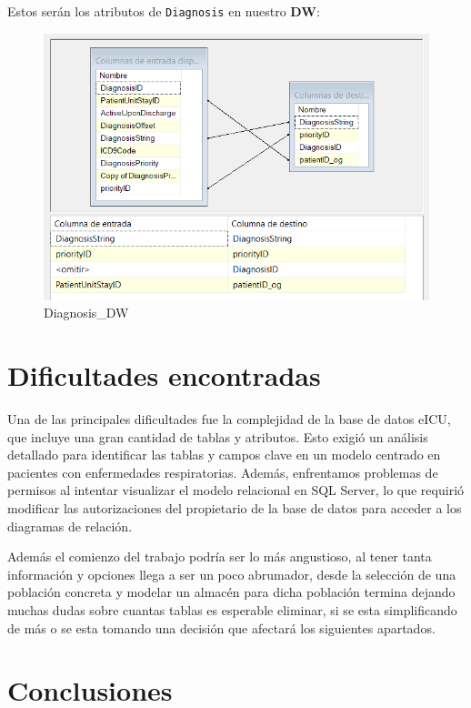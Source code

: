 \documentclass[12pt, a4paper, twoside]{article}
\begin{document}
	Estos serán los atributos de \texttt{Diagnosis} en nuestro \textbf{DW}:
	
	\begin{figure}[h!]
		\centering
		\includegraphics[width=1\textwidth]{image/112_carga_diagnosis_destino.png}
		\caption{Diagnosis\_DW}
		\label{fig:30}
	\end{figure}

	\section{Dificultades encontradas}
	
	
	Una de las principales dificultades fue la complejidad de la base de datos eICU, que incluye una gran cantidad de tablas y atributos. Esto exigió un análisis detallado para identificar las tablas y campos clave en un modelo centrado en pacientes con enfermedades respiratorias. Además, enfrentamos problemas de permisos al intentar visualizar el modelo relacional en SQL Server, lo que requirió modificar las autorizaciones del propietario de la base de datos para acceder a los diagramas de relación.
	
	Además el comienzo del trabajo podría ser lo más angustioso, al tener tanta información y opciones llega a ser un poco abrumador, desde la selección de una población concreta y modelar un almacén para dicha población termina dejando muchas dudas sobre cuantas tablas es esperable eliminar, si se esta simplificando de más o se esta tomando una decisión que afectará los siguientes apartados. 
	
	\section{Conclusiones}
	
\end{document}
